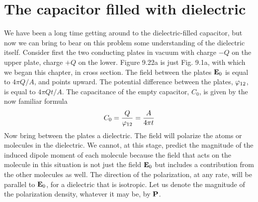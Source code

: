 \section{The capacitor filled with dielectric}

We have been a long time getting around to the dielectric-filled
capacitor, but now we can bring to bear on this problem some understanding
of the dielectric itself. Consider first the two conducting
plates in vacuum with charge  $-Q$ on the upper plate, charge $+Q$
on the lower. Figure 9.22a is just Fig. 9.1a, with which we began
this chapter, in cross section. The field between the plates $\mathbf{E}_0$ is
equal to $4\pi Q/A$, and points upward. The potential difference between
the plates, $\varphi_{12}$, is equal to $4\pi Qt/A$. The capacitance of the
empty capacitor, $C_0$, is given by the now familiar formula
\begin{equation}
  C_0 = \frac{Q}{\varphi_{12}} = \frac{A}{4\pi t}
\end{equation}
Now bring between the plates a dielectric. The field will polarize
the atoms or molecules in the dielectric. We cannot, at this stage,
predict the magnitude of the induced dipole moment of each molecule
because the field that acts on the molecule in this situation is
not just the field $\mathbf{E}_0$ but includes a contribution from the other molecules
as well. The direction of the polarization, at any rate, will be
parallel to $\mathbf{E}_0$, for a dielectric that is isotropic. Let us denote the
magnitude of the polarization density, whatever it may be, by $\mathbf{P}$.

